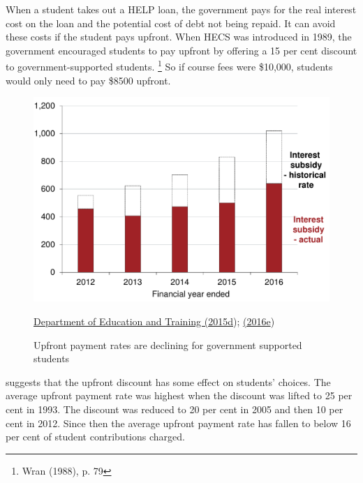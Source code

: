 \documentclass[embargoed]{grattan}
\begin{document}
{When a student takes out a \gls{HELP} loan, the government pays for the real interest cost on the loan and the potential cost of debt not being repaid.
It can avoid these costs if the student pays upfront.
When \gls{HECS} was introduced in 1989, the government encouraged students to pay upfront by offering a 15 per cent discount to government-supported students.%
\footnote{Wran (1988), p. 79} So if course fees were \$10,000, students would only need to pay \$8500 upfront.

\begin{figure}
\caption{Upfront payment rates are declining for government supported students}\label{fig:fig6-upfront-payment-rates-are-declining-for-govt-supported-students}

\includegraphics[page=6]{atlas/Chartpack.pdf}

{\protect\hyperlink{_ENREF_27}{Department of Education and Training (2015d}); \protect\hyperlink{_ENREF_33}{(2016e})}
\end{figure}

 suggests that the upfront discount has some effect on students' choices.
The average upfront payment rate was highest when the discount was lifted to 25 per cent in 1993.
The discount was reduced to 20 per cent in 2005 and then 10 per cent in 2012.
Since then the average upfront payment rate has fallen to below 16 per cent of student contributions charged.

}
\end{document}
